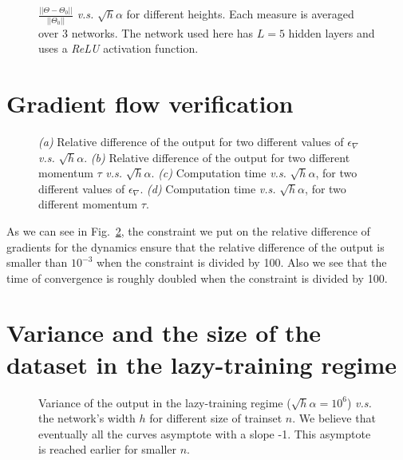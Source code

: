 \documentclass{article}
\newcommand{\abs}[1]{|\!|#1|\!|}
\newcommand{\fref}[1]{Fig.~\ref{#1}}
\begin{document}
\begin{figure}[ht]
    \centering
    \caption{$\frac{\abs{ \Theta - \Theta_0 }}{\abs{ \Theta_0}}$ {\it v.s.} $\sqrt{h}\alpha$ for different heights. Each measure is averaged over 3 networks.
    The network used here has $L=5$ hidden layers and uses a \textit{ReLU} activation function.
    \label{fig:ReLU_th}}
\end{figure}


\section{Gradient flow verification}
\label{app:sanity_check}

\begin{figure}[ht]
    \centering
    \caption{\emph{(a)} Relative difference of the output for two different values of $\epsilon_\nabla$ \textit{v.s.} $\sqrt{h} \alpha$. \emph{(b)} Relative difference of the output for two different momentum $\tau$ \textit{v.s.} $\sqrt{h} \alpha$. \emph{(c)} Computation time \textit{v.s.} $\sqrt{h} \alpha$, for two different values of $\epsilon_\nabla$. \emph{(d)} Computation time \textit{v.s.} $\sqrt{h} \alpha$, for two different momentum $\tau$.
    \label{fig:sanity_check}}
\end{figure}

As we can see in \fref{fig:sanity_check}, the constraint we put on the relative difference of gradients for the dynamics ensure that the relative difference of the output is smaller than $10^{-3}$ when the constraint is divided by 100. Also we see that the time of convergence is roughly doubled when the constraint is divided by 100.

\section{Variance and the size of the dataset in the lazy-training regime}
\label{app:var_p}


\begin{figure}[ht]
    \centering
    \caption{\label{fig:var_p} Variance of the output in the lazy-training regime ($\sqrt{h} \alpha = 10^6$) \textit{v.s.} the network's width $h$ for different size of trainset $n$. We believe that eventually all the curves asymptote with a slope -1. This asymptote is reached earlier for smaller $n$.}
\end{figure}
\end{document}
